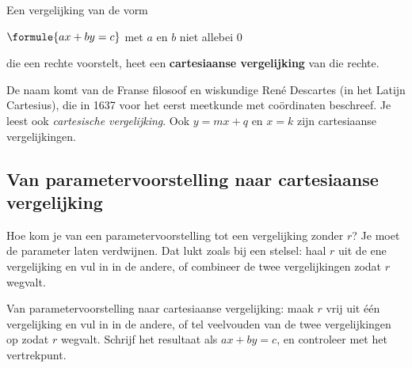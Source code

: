 \begin{theorie}
Een vergelijking van de vorm

\vspace{1mm}
\qquad $\formule{ax + by = c}$ \qquad met $a$ en $b$ niet allebei $0$

\vspace{1mm}
die een rechte voorstelt, heet een \textbf{\textcolor{accent}{cartesiaanse vergelijking}} van die rechte.
\end{theorie}

De naam komt van de Franse filosoof en wiskundige René Descartes (in het Latijn Cartesius), die in 1637 voor het eerst meetkunde met coördinaten beschreef. Je leest ook \textit{cartesische vergelijking}. Ook $y = mx + q$ en $x = k$ zijn cartesiaanse vergelijkingen.

\subsection{Van parametervoorstelling naar cartesiaanse vergelijking}

Hoe kom je van een parametervoorstelling tot een vergelijking zonder $r$? Je moet de parameter laten verdwijnen. Dat lukt zoals bij een stelsel: haal $r$ uit de ene vergelijking en vul in in de andere, of combineer de twee vergelijkingen zodat $r$ wegvalt.


\begin{werkwijze}
Van parametervoorstelling naar cartesiaanse vergelijking: maak $r$ vrij uit één vergelijking en vul in in de andere, of tel veelvouden van de twee vergelijkingen op zodat $r$ wegvalt. Schrijf het resultaat als $ax + by = c$, en controleer met het vertrekpunt.
\end{werkwijze}

